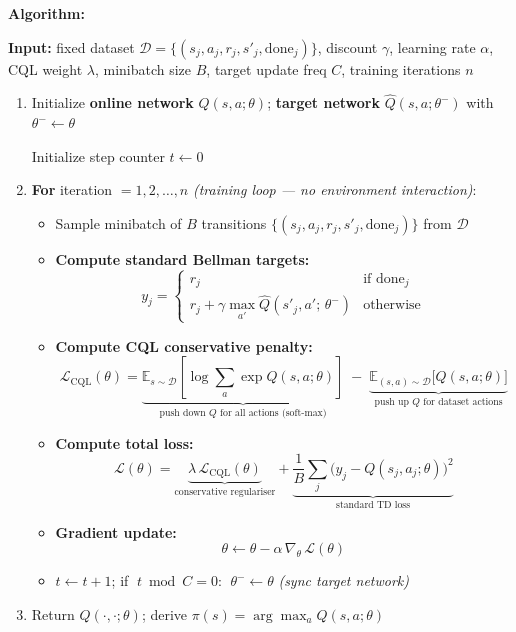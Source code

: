 \documentclass[11pt]{article}
\begin{document}
    \textbf{Algorithm:}

\textbf{Input:} fixed dataset
\(\mathcal{D} = \{(s_j, a_j, r_j, s'_j, \text{done}_j)\}\), discount
\(\gamma\), learning rate \(\alpha\), CQL weight \(\lambda\), minibatch
size \(B\), target update freq \(C\), training iterations \(n\)

\begin{enumerate}
\def\labelenumi{\arabic{enumi}.}
\item
  Initialize \textbf{online network} \(Q(s,a;\theta)\); \textbf{target
  network} \(\hat{Q}(s,a;\theta^-)\) with \(\theta^- \leftarrow \theta\)

  Initialize step counter \(t \leftarrow 0\)
\item
  \textbf{For} iteration \(= 1, 2, \ldots, n\) \emph{(training loop ---
  no environment interaction)}:

  \begin{itemize}
  \item
    Sample minibatch of \(B\) transitions
    \(\{(s_j, a_j, r_j, s'_j, \text{done}_j)\}\) from \(\mathcal{D}\)
  \item
    \textbf{Compute standard Bellman targets:}
    \[y_j = \begin{cases} r_j & \text{if } \text{done}_j \\ r_j + \gamma \max_{a'} \hat{Q}(s'_j, a';\, \theta^-) & \text{otherwise} \end{cases}\]
  \item
    \textbf{Compute CQL conservative penalty:}
    \[\mathcal{L}_\text{CQL}(\theta) = \underbrace{\mathbb{E}_{s \sim \mathcal{D}}\!\left[\log \sum_a \exp Q(s,a;\theta)\right]}_{\text{push down } Q \text{ for all actions (soft-max)}} \;-\; \underbrace{\mathbb{E}_{(s,a) \sim \mathcal{D}}\!\bigl[Q(s,a;\theta)\bigr]}_{\text{push up } Q \text{ for dataset actions}}\]
  \item
    \textbf{Compute total loss:}
    \[\mathcal{L}(\theta) = \underbrace{\lambda\,\mathcal{L}_\text{CQL}(\theta)}_{\text{conservative regulariser}} + \underbrace{\frac{1}{B}\sum_j \bigl(y_j - Q(s_j,a_j;\theta)\bigr)^2}_{\text{standard TD loss}}\]
  \item
    \textbf{Gradient update:}
    \[\theta \leftarrow \theta - \alpha\,\nabla_\theta\,\mathcal{L}(\theta)\]
  \item
    \(t \leftarrow t+1\); if \(\;t \bmod C = 0\):
    \(\;\theta^- \leftarrow \theta\) \emph{(sync target network)}
  \end{itemize}
\item
  Return \(Q(\cdot,\cdot;\theta)\); derive
  \(\pi(s) = \arg\max_a Q(s,a;\theta)\)
\end{enumerate}
\end{document}
